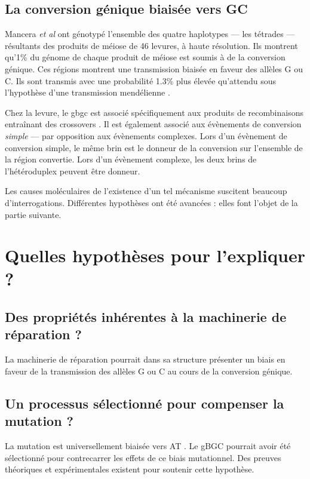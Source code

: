 \documentclass[11pt, oneside]{scrartcl}
\begin{document}
\subsection{La conversion génique biaisée vers GC}
\label{sec:orgheadline7}


Mancera \emph{et al} \cite{mancera_high-resolution_2008} ont génotypé l'ensemble des
quatre haplotypes --- les tétrades --- résultants des produits de méiose de 46
levures, à haute résolution. Ils montrent qu'1\% du génome de chaque produit de
méiose est soumis à de la conversion génique. Ces régions montrent une
transmission biaisée en faveur des allèles G ou C. Ils sont transmis avec une
probabilité 1.3\% plus élevée qu'attendu sous l'hypothèse d'une transmission
mendélienne \cite{mancera_high-resolution_2008}. 

Chez la levure, le \ac{gbgc} est associé spécifiquement aux produits de
recombinaisons entraînant des crossovers \cite{lesecque_gc-biased_2013}. Il est
également associé aux évènements de conversion \emph{simple} --- par opposition aux
évènements complexes. Lors d'un évènement de conversion simple, le même brin est
le donneur de la conversion sur l'ensemble de la région convertie. Lors d'un
évènement complexe, les deux brins de l'hétéroduplex peuvent être donneur. 

\begin{transition}
  Les causes moléculaires de l'existence d'un tel mécanisme suscitent beaucoup
  d'interrogations. Différentes hypothèses ont été avancées : elles font l'objet
  de la partie suivante. 
\end{transition}

\section{Quelles hypothèses pour l'expliquer ?}
\label{sec:orgheadline11}
\subsection{Des propriétés inhérentes à la machinerie de réparation ?}
\label{sec:orgheadline9}
La machinerie de réparation pourrait dans sa structure présenter un biais en
faveur de la transmission des allèles G ou C au cours de la conversion génique. 
\subsection{Un processus sélectionné pour compenser la mutation ?}
\label{sec:orgheadline10}
La mutation est universellement biaisée vers AT
\cite{lynch_rate_2010,hershberg_evidence_2010}. Le gBGC pourrait avoir été
sélectionné pour contrecarrer les effets de ce biais
mutationnel\cite{marais_biased_2003}. Des preuves théoriques et expérimentales
existent pour soutenir cette hypothèse.
\end{document}
